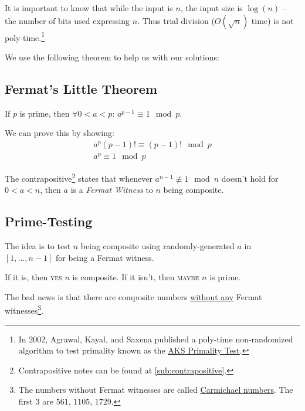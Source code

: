                 It is important to know that while the input is $n$, the input size is $\log(n)$ -- the number of bits used expressing $n$.
                Thus trial division ($O(\sqrt{n})$ time) is not poly-time.\footnote{In 2002, Agrawal, Kayal, and Saxena published a poly-time non-randomized algorithm to test primality known as the \href{https://en.wikipedia.org/wiki/AKS_primality_test}{AKS Primality Test}.}

                We use the following theorem to help us with our solutions:
                \subsection{Fermat's Little Theorem} %
                \label{sub:fermat_s_little_theorem}
                    If $p$ is prime, then $\forall 0 < a < p$: $a^{p-1} \equiv 1 \mod p$.

                    We can prove this by showing:
                    \begin{align*}
                        a^p(p-1)! \equiv (p-1)! \mod p \\
                        a^p \equiv 1 \mod p
                    \end{align*}

                    The contrapositive\footnote{Contrapositive notes can be found at \ref{sub:contrapositive}.} states that whenever $a^{n-1} \not \equiv 1 \mod n$ doesn't hold for $0 < a < n$, then $a$ is a \textit{Fermat Witness} to $n$ being composite.
                \subsection{Prime-Testing} %
                \label{sub:prime_testing}
                    The idea is to test $n$ being composite using randomly-generated $a$ in $[1, \ldots, n-1]$ for being a Fermat witness.

                    If it is, then \textsc{yes} $n$ is composite.
                    If it isn't, then \textsc{maybe} $n$ is prime.

                    The bad news is that there are composite numbers \uline{without any} Fermat witnesses\footnote{The numbers without Fermat witnesses are called \uline{Carmichael numbers}.
                    The first $3$ are $561$, $1105$, $1729$.}.

